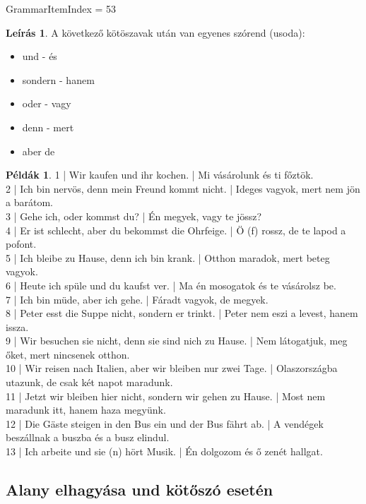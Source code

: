\documentclass{article}
\theoremstyle{definition}
\newtheorem*{exmp}{Példák}
\newtheorem*{desc}{Leírás}
\begin{document}
GrammarItemIndex = 53

\begin{desc}
A következő kötöszavak után van egyenes szórend (usoda):
\begin{itemize}
\item und - és
\item sondern - hanem
\item oder - vagy
\item denn - mert
\item aber  de
\end{itemize}
\end{desc}

\begin{exmp}	%
1 | Wir kaufen und ihr kochen. | Mi vásárolunk és ti főztök.\\
2 | Ich bin nervös, denn mein Freund kommt nicht. | Ideges vagyok, mert nem jön a barátom.\\
3 | Gehe ich, oder kommst du? | Én megyek, vagy te jössz?\\
4 | Er ist schlecht, aber du bekommst die Ohrfeige. | Ö (f) rossz, de te lapod a pofont.\\
5 | Ich bleibe zu Hause, denn ich bin krank. | Otthon maradok, mert beteg vagyok.\\
6 | Heute ich spüle und du kaufst ver. | Ma én mosogatok és te vásárolsz be.\\
7 | Ich bin müde, aber ich gehe. | Fáradt vagyok, de megyek.\\
8 | Peter esst die Suppe nicht, sondern er trinkt. | Peter nem eszi a levest, hanem issza.\\
9 | Wir besuchen sie nicht, denn sie sind nich zu Hause. | Nem látogatjuk, meg őket, mert nincsenek otthon.\\
10 | Wir reisen nach Italien, aber wir bleiben nur zwei Tage. | Olaszországba utazunk, de csak két napot maradunk.\\
11 | Jetzt wir bleiben hier nicht, sondern wir gehen zu Hause. | Most nem maradunk itt, hanem haza megyünk.\\
12 | Die Gäste steigen in den Bus ein und der Bus fährt ab. | A vendégek beszállnak a buszba és a busz elindul.\\
13 | Ich arbeite und sie (n) hört Musik. | Én dolgozom és ő zenét hallgat.\\
\end{exmp}

\subsection{Alany elhagyása und kötőszó esetén}
\end{document}
